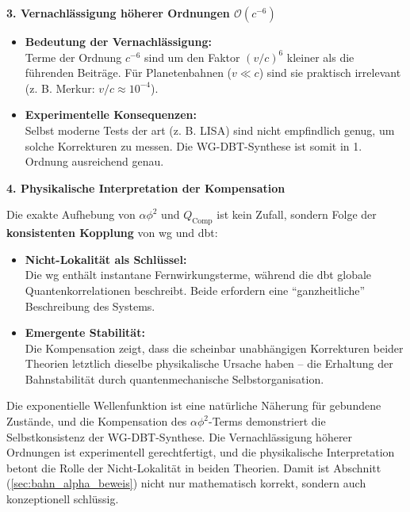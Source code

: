 \textbf{3. Vernachlässigung höherer Ordnungen $\mathcal{O}(c^{-6})$}

\begin{itemize}
    \item \textbf{Bedeutung der Vernachlässigung:}\\Terme der Ordnung $c^{-6}$ sind um den Faktor $(v/c)^{6}$ kleiner als die führenden Beiträge. Für Planetenbahnen ($v \ll c$) sind sie praktisch irrelevant (z. B. Merkur: $v/c \approx 10^{-4}$).
    \item \textbf{Experimentelle Konsequenzen:}\\Selbst moderne Tests der \gls{art} (z. B. LISA) sind nicht empfindlich genug, um solche Korrekturen zu messen. Die WG-DBT-Synthese ist somit in 1. Ordnung ausreichend genau.
\end{itemize}

\textbf{4. Physikalische Interpretation der Kompensation}

Die exakte Aufhebung von $\alpha \phi^{2}$ und $Q_\text{Comp}$ ist kein Zufall, sondern Folge der \textbf{konsistenten Kopplung} von \gls{wg} und \gls{dbt}:
\begin{itemize}
    \item \textbf{Nicht-Lokalität als Schlüssel:}\\Die \gls{wg} enthält instantane Fernwirkungsterme, während die \gls{dbt} globale Quantenkorrelationen beschreibt. Beide erfordern eine \enquote{ganzheitliche} Beschreibung des Systems.
    \item \textbf{Emergente Stabilität:}\\Die Kompensation zeigt, dass die scheinbar unabhängigen Korrekturen beider Theorien letztlich dieselbe physikalische Ursache haben – die Erhaltung der Bahnstabilität durch quantenmechanische Selbstorganisation.
\end{itemize}

Die exponentielle Wellenfunktion ist eine natürliche Näherung für gebundene Zustände, und die Kompensation des $\alpha \phi^{2}$-Terms demonstriert die Selbstkonsistenz der WG-DBT-Synthese.
Die Vernachlässigung höherer Ordnungen ist experimentell gerechtfertigt, und die physikalische Interpretation betont die Rolle der Nicht-Lokalität in beiden Theorien. Damit ist
Abschnitt (\ref{sec:bahn_alpha_beweis}) nicht nur mathematisch korrekt, sondern auch konzeptionell schlüssig.
